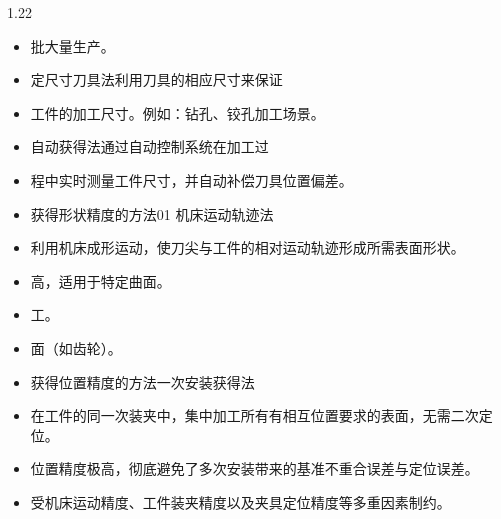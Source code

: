 \documentclass[12pt,a4paper]{article}
\begin{document}
\begin{spacing}{1.22}
\begin{itemize}[leftmargin=2.2em,label=--]
  \item 批大量生产。
  \item 定尺寸刀具法利用刀具的相应尺寸来保证
  \item 工件的加工尺寸。例如：钻孔、铰孔加工场景。
  \item 自动获得法通过自动控制系统在加工过
  \item 程中实时测量工件尺寸，并自动补偿刀具位置偏差。
  \item 获得形状精度的方法01 机床运动轨迹法
  \item 利用机床成形运动，使刀尖与工件的相对运动轨迹形成所需表面形状。
  \item 高，适用于特定曲面。
  \item 工。
  \item 面（如齿轮）。
  \item 获得位置精度的方法一次安装获得法
  \item 在工件的同一次装夹中，集中加工所有有相互位置要求的表面，无需二次定位。
  \item 位置精度极高，彻底避免了多次安装带来的基准不重合误差与定位误差。
  \item 受机床运动精度、工件装夹精度以及夹具定位精度等多重因素制约。
\end{itemize}


\end{spacing}
\end{document}
